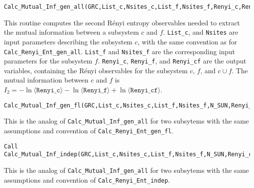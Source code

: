 \begin{lstlisting}[style=fortran]
Calc_Mutual_Inf_gen_all(GRC,List_c,Nsites_c,List_f,Nsites_f,Renyi_c,Renyi_f,Renyi_cf)
\end{lstlisting}
This routine computes the second R\'enyi entropy observables needed to extract the mutual information between a subsystem $c$ and $f$. \texttt{List\_c}, and \texttt{Nsites} are input parameters describing the subsystem $c$, with the same convention as for \texttt{Calc\_Renyi\_Ent\_gen\_all}. \texttt{List\_f} and \texttt{Nsites\_f} are the corresponding input parameters for the subsystem $f$. \texttt{Renyi\_c}, \texttt{Renyi\_f}, and \texttt{Renyi\_cf} are the output variables, containing the R\'enyi observables for the subsystem $c$, $f$, and $c\cup f$. The mutual information between $c$ and $f$ is $I_2=-\ln \langle \texttt{Renyi\_c}\rangle -\ln \langle \texttt{Renyi\_f}\rangle +\ln \langle \texttt{Renyi\_cf}\rangle$.

\begin{lstlisting}[style=fortran,breaklines=true]
Calc_Mutual_Inf_gen_fl(GRC,List_c,Nsites_c,List_f,Nsites_f,N_SUN,Renyi_c,Renyi_f,Renyi_cf)
\end{lstlisting}
This is the analog of \texttt{Calc\_Mutual\_Inf\_gen\_all} for two subsytems with the same assumptions and convention of \texttt{Calc\_Renyi\_Ent\_gen\_fl}.

\begin{lstlisting}[style=fortran,breaklines=true]
Call Calc_Mutual_Inf_indep(GRC,List_c,Nsites_c,List_f,Nsites_f,N_SUN,Renyi_c,Renyi_f,Renyi_cf)
\end{lstlisting}
This is the analog of \texttt{Calc\_Mutual\_Inf\_gen\_all} for two subsytems with the same assumptions and convention of \texttt{Calc\_Renyi\_Ent\_indep}.
